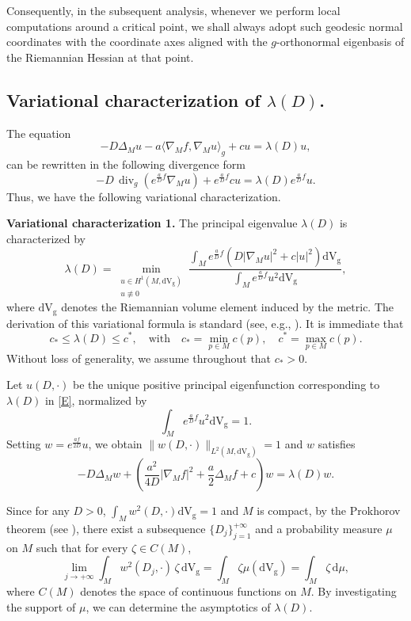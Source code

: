 \documentclass[12pt,reqno]{amsart}
\newcommand{\V}{\mathrm{d} \mathrm{V_g}}
\DeclareMathOperator{\dive}{div}
\numberwithin{equation}{section}
\begin{document}
Consequently, in the subsequent analysis, whenever we perform local computations around a critical point, we shall always adopt such geodesic normal coordinates with the coordinate axes aligned with the $g$-orthonormal eigenbasis of the Riemannian Hessian at that point.


\subsection{Variational characterization of $\lambda(D)$.}
The equation 
\begin{equation*}
   -D\Delta_{M}u-a\langle  \nabla_M f, \nabla_M u\rangle_g +c u=\lambda(D)u,
\end{equation*}
can be rewritten in the following divergence form
\begin{equation*}
   -D\,\dive_g\left(e^{\frac{a}{D} f}\nabla_{M}u\right)+e^{\frac{a}{D} f} c u=\lambda(D)e^{\frac{a}{D} f} u.   
\end{equation*}
Thus, we have the following variational characterization.

\textbf{Variational characterization 1.} The principal eigenvalue $\lambda(D)$ is characterized by
\begin{equation}\label{var}
  \lambda(D)=\min_{\substack{u\in H^1(M,\V)\\ u\not\equiv 0}}
  \frac{\displaystyle\int_M e^{\frac{a}{D} f}\left(D|\nabla_{M}u|^2 + c |u|^2\right)\V}
  {\displaystyle\int_M e^{\frac{a}{D} f} u^2 \V},
\end{equation}
where $\V$ denotes the Riemannian volume element induced by the metric. The derivation of this variational formula is standard (see, e.g., \cite{zhoudetang,XZ26}). It is immediate that 
\[
c_*\le \lambda(D)\le c^*, 
\quad\text{with}\quad
c_*=\min_{p\in M} c(p),\quad c^*=\max_{p\in M} c(p).
\]
Without loss of generality, we assume throughout that \(c_*>0\).


Let \(u(D,\cdot)\) be the unique positive principal eigenfunction corresponding to $\lambda(D)$ in \eqref{E}, normalized by
\[
\int_{M} e^{ \frac{a}{D}f}u^2\V =1.
\]
Setting $w=e^{\frac{a f}{2 D} }u$, we obtain $\|w(D, \cdot)\|_{L^2(M,\V)}=1$ and $w$ satisfies
\begin{equation}\label{Ew}
   -D\Delta_{M}w+\left(\frac{a^2}{4 D}  |\nabla_M f|^2+ \frac{a}{2}\Delta_M f +c\right) w=\lambda(D)w.   
\end{equation}

Since for any $D>0$, $\int_M w^2(D,\cdot)\V=1$ and $M$ is compact, by the Prokhorov theorem (see \cite{yan}), there exist a subsequence $\{D_j\}_{j=1}^{+\infty}$ and a probability measure $\mu$ on $M$ such that for every $\zeta\in C(M)$,
\begin{equation}\label{weak}
\lim_{j\to+\infty}\int_M w^2(D_j,\cdot)\,\zeta\,\V=\int_M \zeta\mu(\mathrm{d} \mathrm{V_g})=\int_M \zeta\,\mathrm d\mu,
\end{equation}
where $C(M)$ denotes the space of continuous functions on $M$. By investigating the support of $\mu$, we can determine the asymptotics of $\lambda(D)$. 
\end{document}
